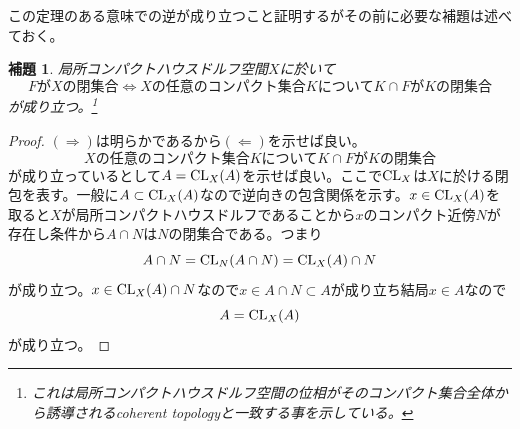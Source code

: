 \documentclass[leqno]{jsarticle}
\newtheorem{lem}[thm]{補題}
\newcommand{\To}{\Longrightarrow}
\newcommand{\Gets}{\Longleftarrow}
\newcommand{\cl}{\text{{\rm CL}}}
\begin{document}
この定理のある意味での逆が成り立つこと証明するがその前に必要な補題は述べておく。
\begin{lem}\label{kk}
局所コンパクトハウスドルフ空間$X$に於いて
\[
FがXの閉集合\iff Xの任意のコンパクト集合KについてK\cap FがKの閉集合
\]
が成り立つ。\footnote{これは局所コンパクトハウスドルフ空間の位相がそのコンパクト集合全体から誘導されるcoherent topologyと一致する事を示している。}
\end{lem}
\begin{proof}$(\To)$は明らかであるから$(\Gets)$を示せば良い。\\ 
\begin{equation*}
Xの任意のコンパクト集合KについてK\cap FがKの閉集合
\end{equation*}
が成り立っているとして$A=\cl_X(A)$を示せば良い。ここで$\cl_X$は$X$に於ける閉包を表す。一般に$A\subset \cl_X(A)$なので逆向きの包含関係を示す。$x\in \cl_X(A)$を取ると$X$が局所コンパクトハウスドルフであることから$x$のコンパクト近傍$N$が存在し条件から$A\cap N$は$N$の閉集合である。つまり
\[
A\cap N=\cl_N(A\cap N)=\cl_X(A)\cap N
\]
が成り立つ。$x\in \cl_X(A)\cap N$なので$x\in A\cap N\subset A$が成り立ち結局$x\in A$なので
\[
A=\cl_X(A)
\]
が成り立つ。
\end{proof}
\end{document}
